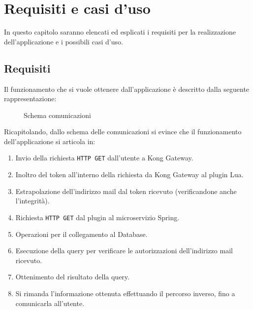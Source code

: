 \chapter{Requisiti e casi d'uso}\label{chapter:requisiti}
In questo capitolo saranno elencati ed esplicati i requisiti per la realizzazione dell'applicazione e i possibili casi d'uso.

\section{Requisiti}\label{sec:requisiti}
Il funzionamento che si vuole ottenere dall'applicazione è descritto dalla seguente rappresentazione:

\begin{figure}[H]
    \centering
    \caption{Schema comunicazioni}
    \label{fig:comunicationscheme}
\end{figure}

Ricapitolando, dallo schema delle comunicazioni si evince che il funzionamento dell'applicazione si articola in:
\begin{enumerate}
\item Invio della richiesta \texttt{HTTP GET} dall'utente a Kong Gateway.
\item Inoltro del token all'interno della richiesta da Kong Gateway al plugin Lua.
\item Estrapolazione dell'indirizzo mail dal token ricevuto (verificandone anche l'integrità).
\item Richiesta \texttt{HTTP GET} dal plugin al microservizio Spring.
\item Operazioni per il collegamento al Database.
\item Esecuzione della query per verificare le autorizzazioni dell'indirizzo mail ricevuto.
\item Ottenimento del risultato della query.
\item Si rimanda l'informazione ottenuta effettuando il percorso inverso, fino a comunicarla all'utente. 
\end{enumerate}

